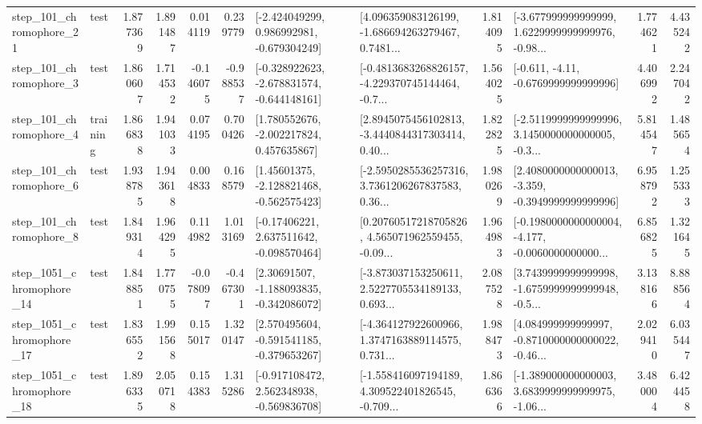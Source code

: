 \begin{tabular}{llrrrrllrlrr}
  step\_101\_chromophore\_21 &      test &      1.877369 &    1.891487 &      0.014119 &  0.239779 &   [-2.424049299, 0.986992981, -0.679304249] &  [4.096359083126199, -1.686694263279467, 0.7481... &       1.814095 &  [-3.677999999999999, 1.6229999999999976, -0.98... &            1.774621 &          4.435242 \\
   step\_101\_chromophore\_3 &      test &      1.860607 &    1.714532 &     -0.146075 & -0.988537 &  [-0.328922623, -2.678831574, -0.644148161] &  [-0.4813683268826157, -4.229370745144464, -0.7... &       1.564025 &               [-0.611, -4.11, -0.6769999999999996] &            4.406992 &          2.247042 \\
   step\_101\_chromophore\_4 &  training &      1.866838 &    1.941033 &      0.074195 &  0.700426 &    [1.780552676, -2.002217824, 0.457635867] &  [2.8945075456102813, -3.4440844317303414, 0.40... &       1.822825 &  [-2.5119999999999996, 3.1450000000000005, -0.3... &            5.814547 &          1.485654 \\
   step\_101\_chromophore\_6 &      test &      1.938785 &    1.943618 &      0.004833 &  0.168579 &    [1.45601375, -2.128821468, -0.562575423] &  [-2.5950285536257316, 3.7361206267837583, 0.36... &       1.980269 &  [2.4080000000000013, -3.359, -0.3949999999999996] &            6.958792 &          1.255333 \\
   step\_101\_chromophore\_8 &      test &      1.849314 &    1.964295 &      0.114982 &  1.013169 &    [-0.17406221, 2.637511642, -0.098570464] &  [0.20760517218705826, 4.565071962559455, -0.09... &       1.964983 &  [-0.1980000000000004, -4.177, -0.0060000000000... &            6.856825 &          1.321645 \\
 step\_1051\_chromophore\_14 &      test &      1.848851 &    1.770755 &     -0.078097 & -0.467301 &    [2.30691507, -1.188093835, -0.342086072] &  [-3.873037153250611, 2.5227705534189133, 0.693... &       2.087528 &  [3.7439999999999998, -1.6759999999999948, -0.5... &            3.138166 &          8.888564 \\
 step\_1051\_chromophore\_17 &      test &      1.836552 &    1.991568 &      0.155017 &  1.320147 &   [2.570495604, -0.591541185, -0.379653267] &  [-4.364127922600966, 1.3747163889114575, 0.731... &       1.988473 &  [4.084999999999997, -0.8710000000000022, -0.46... &            2.029410 &          6.035447 \\
 step\_1051\_chromophore\_18 &      test &      1.896335 &    2.050718 &      0.154383 &  1.315286 &   [-0.917108472, 2.562348938, -0.569836708] &  [-1.558416097194189, 4.309522401826545, -0.709... &       1.866366 &  [-1.389000000000003, 3.6839999999999975, -1.06... &            3.480004 &          6.424458 \\

\end{tabular}
